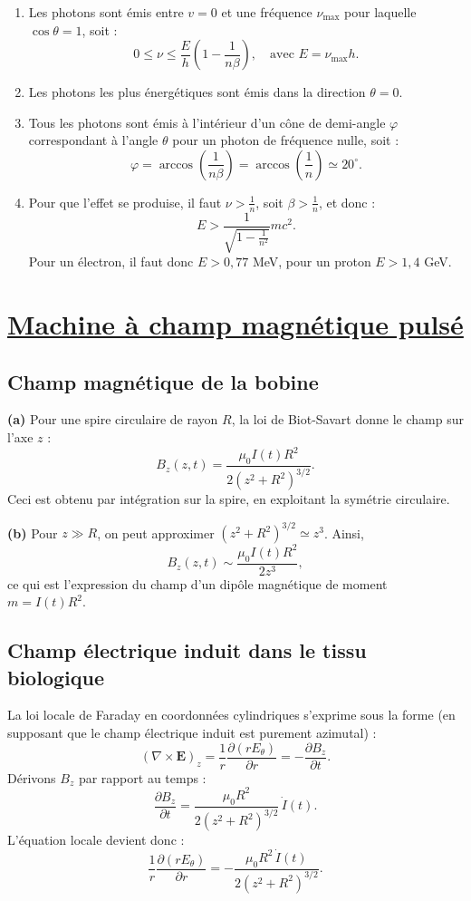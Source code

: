 \documentclass[a4paper,10pt]{report}
\begin{document}
\begin{enumerate}
		\item Les photons sont émis entre $v = 0$ et une fréquence $\nu_{\text{max}}$ pour laquelle $\cos\theta = 1$, soit :
		\[
		0 \leq \nu \leq \frac{E}{h} \left(1 - \frac{1}{n\beta} \right), \quad \text{avec } E = \nu_{\text{max}} h.
		\]
		
		\item Les photons les plus énergétiques sont émis dans la direction $\theta = 0$.
		
		\item Tous les photons sont émis à l’intérieur d’un cône de demi-angle $\varphi$ correspondant à l’angle $\theta$ pour un photon de fréquence nulle, soit :
		\[
		\varphi = \arccos \left( \frac{1}{n\beta} \right) = \arccos \left( \frac{1}{n} \right) \simeq 20^\circ.
		\]
		
		\item Pour que l’effet se produise, il faut $\nu > \frac{1}{n}$, soit $\beta > \frac{1}{n}$, et donc :
		\[
		E > \frac{1}{\sqrt{1 - \frac{1}{n^2}}} mc^2.
		\]
		Pour un électron, il faut donc $E > 0{,}77$ MeV, pour un proton $E > 1{,}4$ GeV.
	\end{enumerate}
	\newpage \section{\hyperref[subsec:machine]{Machine à champ magnétique pulsé}}\label{subsec:correctionmachine}
	\subsection{Champ magnétique de la bobine}
	\textbf{(a)} Pour une spire circulaire de rayon $R$, la loi de Biot-Savart donne le champ sur l'axe $z$ :
	\[
	B_z(z,t)= \frac{\mu_0 I(t) R^2}{2\left(z^2+R^2\right)^{3/2}}.
	\]
	Ceci est obtenu par intégration sur la spire, en exploitant la symétrie circulaire.
	
	\textbf{(b)} Pour $z \gg R$, on peut approximer $\left(z^2+R^2\right)^{3/2} \simeq z^3$. Ainsi,
	\[
	B_z(z,t)\sim \frac{\mu_0 I(t) R^2}{2z^3},
	\]
	ce qui est l'expression du champ d'un dipôle magnétique de moment $m= I(t) R^2$.
	
	\subsection{Champ électrique induit dans le tissu biologique}
	La loi locale de Faraday en coordonnées cylindriques s'exprime sous la forme (en supposant que le champ électrique induit est purement azimutal) :
	\[
	\left(\nabla \times \mathbf{E}\right)_z = \frac{1}{r}\frac{\partial (rE_\theta)}{\partial r} = -\frac{\partial B_z}{\partial t}.
	\]
	Dérivons $B_z$ par rapport au temps :
	\[
	\frac{\partial B_z}{\partial t} = \frac{\mu_0 R^2}{2\left(z^2+R^2\right)^{3/2}}\,\dot{I}(t).
	\]
	L'équation locale devient donc :
	\[
	\frac{1}{r}\frac{\partial (rE_\theta)}{\partial r} = -\frac{\mu_0 R^2\,\dot{I}(t)}{2\left(z^2+R^2\right)^{3/2}}.
	\]
	
\end{document}

